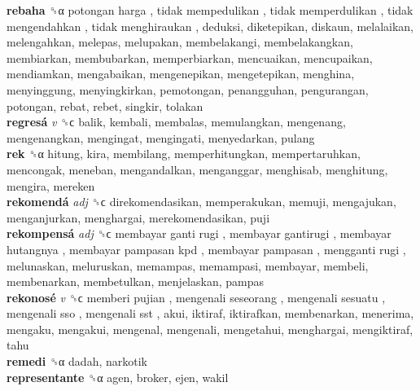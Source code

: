 \textbf{rebaha} ␝α   potongan harga ,  tidak mempedulikan ,  tidak memperdulikan ,  tidak mengendahkan ,  tidak menghiraukan , deduksi, diketepikan, diskaun, melalaikan, melengahkan, melepas, melupakan, membelakangi, membelakangkan, membiarkan, membubarkan, memperbiarkan, mencuaikan, mencupaikan, mendiamkan, mengabaikan, mengenepikan, mengetepikan, menghina, menyinggung, menyingkirkan, pemotongan, penangguhan, pengurangan, potongan, rebat, rebet, singkir, tolakan  \\
\textbf{regresá} \emph{v}  ␝ϲ  balik, kembali, membalas, memulangkan, mengenang, mengenangkan, mengingat, mengingati, menyedarkan, pulang  \\
\textbf{rek} ␝α  hitung, kira, membilang, memperhitungkan, mempertaruhkan, mencongak, meneban, mengandalkan, menganggar, menghisab, menghitung, mengira, mereken  \\
\textbf{rekomendá} \emph{adj}  ␝ϲ  direkomendasikan, memperakukan, memuji, mengajukan, menganjurkan, menghargai, merekomendasikan, puji  \\
\textbf{rekompensá} \emph{adj}  ␝ϲ   membayar ganti rugi ,  membayar gantirugi ,  membayar hutangnya ,  membayar pampasan kpd ,  membayar pampasan ,  mengganti rugi , melunaskan, meluruskan, memampas, memampasi, membayar, membeli, membenarkan, membetulkan, menjelaskan, pampas  \\
\textbf{rekonosé} \emph{v}  ␝ϲ   memberi pujian ,  mengenali seseorang ,  mengenali sesuatu ,  mengenali sso ,  mengenali sst , akui, iktiraf, iktirafkan, membenarkan, menerima, mengaku, mengakui, mengenal, mengenali, mengetahui, menghargai, mengiktiraf, tahu  \\
\textbf{remedi} ␝α  dadah, narkotik  \\
\textbf{representante} ␝α  agen, broker, ejen, wakil  \\
